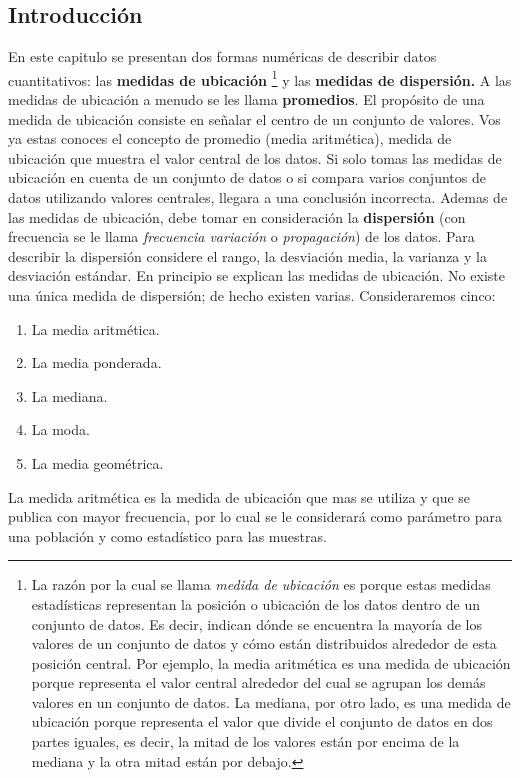 \documentclass[]{article}
\begin{document}
\subsection{Introducción}
En este capitulo se presentan dos formas numéricas de describir datos cuantitativos: las \textbf{medidas de ubicación} 
\footnote{La razón por la cual se llama \textit{medida de ubicación} es porque estas medidas estadísticas representan la posición o ubicación de los datos dentro de un conjunto de datos. Es decir, indican dónde se encuentra la mayoría de los valores de un conjunto de datos y cómo están distribuidos alrededor de esta posición central. Por ejemplo, la media aritmética es una medida de ubicación porque representa el valor central alrededor del cual se agrupan los demás valores en un conjunto de datos. La mediana, por otro lado, es una medida de ubicación porque representa el valor que divide el conjunto de datos en dos partes iguales, es decir, la mitad de los valores están por encima de la mediana y la otra mitad están por debajo.}
y las \textbf{medidas de dispersión.} A las medidas de ubicación a menudo se les llama \textbf{promedios}. El propósito de una medida de ubicación consiste en señalar el centro de un conjunto de valores. Vos ya estas conoces el concepto de promedio (media aritmética), medida de ubicación que muestra el valor central de los datos. Si solo tomas las medidas de ubicación en cuenta de un conjunto de datos o si compara varios conjuntos de datos utilizando valores centrales, llegara a una conclusión incorrecta. Ademas de las medidas de ubicación, debe tomar en consideración la \textbf{dispersión} (con frecuencia se le llama \textit{frecuencia variación }o \textit{propagación}) de los datos. Para describir la dispersión considere el rango, la desviación media, la varianza y la desviación estándar. En principio se explican las medidas de ubicación. No existe una única medida de dispersión; de hecho existen varias. Consideraremos cinco:
\begin{enumerate}
	\item La media aritmética.
	\item La media ponderada.
	\item La mediana.
	\item La moda.
	\item La media geométrica.
\end{enumerate}
La medida aritmética es la medida de ubicación que mas se utiliza y que se publica con mayor frecuencia, por lo cual se le considerará como parámetro para una población y como estadístico para las muestras.
\end{document}

